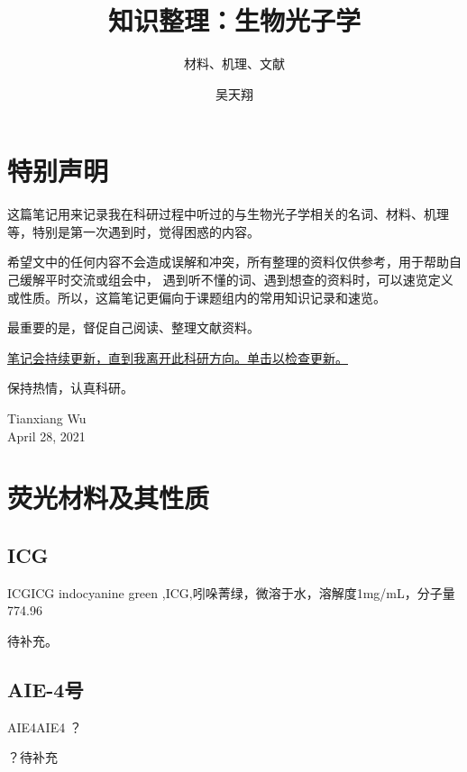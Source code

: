 \documentclass[cn,11pt,chinese]{elegantbook}
\title{知识整理：生物光子学}
\subtitle{材料、机理、文献}
\author{吴天翔}
\institute{BMO-Q's Lab}
\begin{document}
\maketitle
\frontmatter

\chapter*{特别声明}

这篇笔记用来记录我在科研过程中听过的与生物光子学相关的名词、材料、机理等，特别是第一次遇到时，觉得困惑的内容。

希望文中的任何内容不会造成误解和冲突，所有整理的资料仅供参考，用于帮助自己缓解平时交流或组会中，
遇到听不懂的词、遇到想查的资料时，可以速览定义或性质。所以，这篇笔记更偏向于课题组内的常用知识记录和速览。

最重要的是，督促自己阅读、整理文献资料。
\begin{center}
\href{https://github.com/XiangSMK/BMOQLabReviews.git}{笔记会持续更新，直到我离开此科研方向。单击以检查更新。}
\end{center}

保持热情，认真科研。
\vskip 1.5cm

\begin{flushright}
Tianxiang Wu\\
April 28, 2021
\end{flushright}

\tableofcontents

\mainmatter
\chapter{荧光材料及其性质}

\section{ICG}

\begin{proposition}{ICG}{ICG}
indocyanine green ,ICG,吲哚菁绿，微溶于水，溶解度1mg/mL，分子量774.96
\end{proposition}
待补充。


\section{AIE-4号}
\begin{proposition}{AIE4}{AIE4}
？
\end{proposition}
？待补充
\end{document}
